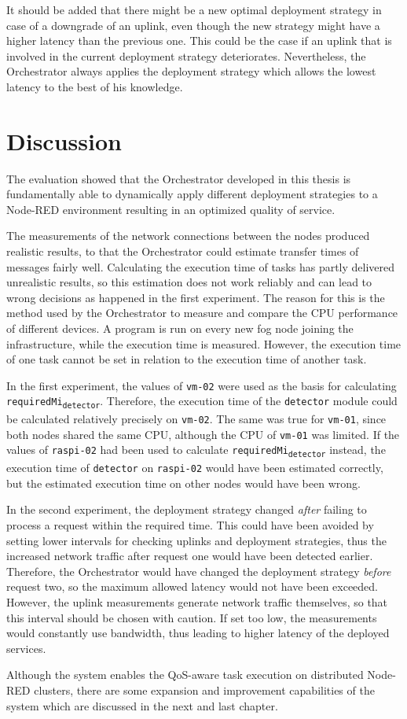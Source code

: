It should be added that there might be a new optimal deployment strategy in case of a downgrade of an uplink, even though the new strategy might have a higher latency than the previous one.
This could be the case if an uplink that is involved in the current deployment strategy deteriorates.
Nevertheless, the Orchestrator always applies the deployment strategy which allows the lowest latency to the best of his knowledge.


\clearpage
\section{Discussion}

The evaluation showed that the Orchestrator developed in this thesis is fundamentally able to dynamically apply different deployment strategies to a Node-RED environment resulting in an optimized quality of service.

The measurements of the network connections between the nodes produced realistic results, to that the Orchestrator could estimate transfer times of messages fairly well.
Calculating the execution time of tasks has partly delivered unrealistic results, so this estimation does not work reliably and can lead to wrong decisions as happened in the first experiment.
The reason for this is the method used by the Orchestrator to measure and compare the CPU performance of different devices.
A program is run on every new fog node joining the infrastructure, while the execution time is measured.
However, the execution time of one task cannot be set in relation to the execution time of another task.

In the first experiment, the values of \texttt{vm-02} were used as the basis for calculating \texttt{requiredMi\textsubscript{detector}}.
Therefore, the execution time of the \texttt{detector} module could be calculated relatively precisely on \texttt{vm-02}.
The same was true for \texttt{vm-01}, since both nodes shared the same CPU, although the CPU of \texttt{vm-01} was limited.
If the values of \texttt{raspi-02} had been used to calculate \texttt{requiredMi\textsubscript{detector}} instead, the execution time of \texttt{detector} on \texttt{raspi-02} would have been estimated correctly, but the estimated execution time on other nodes would have been wrong.

In the second experiment, the deployment strategy changed \textit{after} failing to process a request within the required time.
This could have been avoided by setting lower intervals for checking uplinks and deployment strategies, thus the increased network traffic after request one would have been detected earlier.
Therefore, the Orchestrator would have changed the deployment strategy \textit{before} request two, so the maximum allowed latency would not have been exceeded.
However, the uplink measurements generate network traffic themselves, so that this interval should be chosen with caution.
If set too low, the measurements would constantly use bandwidth, thus leading to higher latency of the deployed services.

Although the system enables the QoS-aware task execution on distributed Node-RED clusters, there are some expansion and improvement capabilities of the system which are discussed in the next and last chapter.
